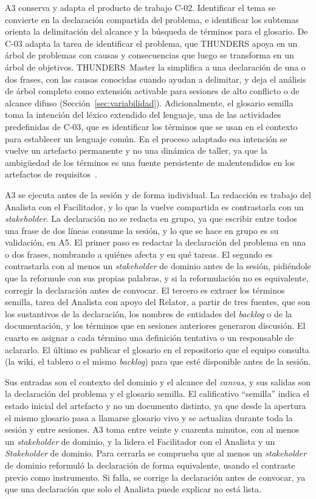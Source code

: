 \documentclass[12pt,letterpaper,oneside]{report}
\begin{document}
A3 conserva y adapta el producto de trabajo C-02. Identificar el tema se convierte en la
declaración compartida del problema, e identificar los subtemas orienta la
delimitación del alcance y la búsqueda de términos para el glosario. De C-03
adapta la tarea de identificar el problema, que THUNDERS apoya en un árbol de
problemas con causas y consecuencias que luego se transforma en un árbol de
objetivos. THUNDERS~Master la simplifica a una declaración de una o dos frases,
con las causas conocidas cuando ayudan a delimitar, y deja el análisis de árbol
completo como extensión activable para sesiones de alto conflicto o de alcance
difuso (Sección~\ref{sec:variabilidad}). Adicionalmente, el glosario semilla
toma la intención del léxico extendido del lenguaje, una de las actividades
predefinidas de C-03, que es identificar los términos que se usan en el
contexto para establecer un lenguaje común. En el proceso adaptado esa intención
se vuelve un artefacto permanente y no una dinámica de taller, ya que la
ambigüedad de los términos es una fuente persistente de malentendidos en los
artefactos de requisitos~\cite{ribeiro2020}.

A3 se ejecuta antes de la sesión y de forma individual. La redacción es trabajo
del Analista con el Facilitador, y lo que la vuelve compartida es contrastarla
con un \textit{stakeholder}. La declaración no se redacta en grupo, ya que
escribir entre todos una frase de dos líneas consume la sesión, y lo que se
hace en grupo es su validación, en A5. El primer paso es redactar la
declaración del problema en una o dos frases, nombrando a quiénes afecta y en
qué tareas. El segundo es contrastarla con al menos un \textit{stakeholder} de
dominio antes de la sesión, pidiéndole que la reformule con sus propias
palabras, y si la reformulación no es equivalente, corregir la declaración antes
de convocar. El tercero es extraer los términos semilla, tarea del Analista con
apoyo del Relator, a partir de tres fuentes, que son los sustantivos de la
declaración,
los nombres de entidades del \textit{backlog} o de la documentación, y los
términos que en sesiones anteriores generaron discusión. El cuarto es asignar a
cada término una definición tentativa o un responsable de aclararlo. El último
es publicar el glosario en el repositorio que el equipo consulta (la wiki, el
tablero o el mismo \textit{backlog}) para que esté disponible antes de la
sesión.

Sus entradas son el contexto del dominio y el alcance del \textit{canvas}, y sus
salidas son la declaración del problema y el glosario semilla. El calificativo
``semilla'' indica el estado inicial del artefacto y no un documento distinto,
ya que desde la apertura el mismo glosario pasa a llamarse glosario vivo y se
actualiza durante toda la sesión y entre sesiones. A3 toma entre veinte y
cuarenta minutos, con al menos un \textit{stakeholder} de dominio, y la lidera
el Facilitador con el Analista y un \textit{Stakeholder} de dominio. Para cerrarla se
comprueba que al menos un \textit{stakeholder} de dominio reformuló la
declaración de forma equivalente, usando el contraste previo como instrumento.
Si falla, se corrige la declaración antes de convocar, ya que una declaración
que solo el Analista puede explicar no está lista.
\end{document}

